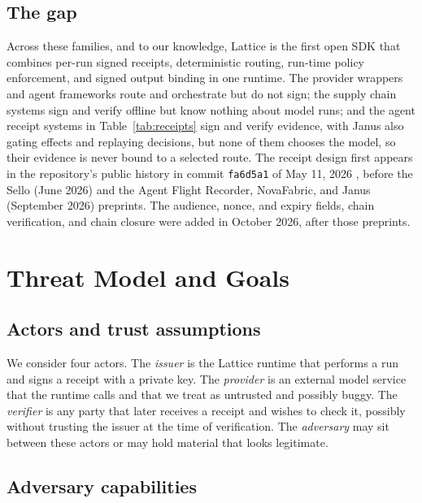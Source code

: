 \documentclass[conference]{IEEEtran}
\newcommand{\code}[1]{\texttt{\small #1}}
\begin{document}
\subsection{The gap}

Across these families, and to our knowledge, Lattice is the first open SDK that
combines per-run signed receipts, deterministic routing, run-time policy enforcement,
and signed output binding in one runtime. The provider wrappers and agent frameworks
route and orchestrate but do not sign; the supply chain systems sign and verify offline
but know nothing about model runs; and the agent receipt systems in
Table~\ref{tab:receipts} sign and verify evidence, with Janus also gating effects
and replaying decisions, but none of them chooses the model, so their evidence is never
bound to a selected route. The receipt design first appears in the repository's
public history in commit \code{fa6d5a1} of May 11, 2026 \cite{lattice}, before the Sello (June 2026)
and the Agent Flight Recorder, NovaFabric, and Janus (September 2026) preprints. The
audience, nonce, and expiry fields, chain verification, and chain closure were added in
October 2026, after those preprints.

\section{Threat Model and Goals}

\subsection{Actors and trust assumptions}

We consider four actors. The \emph{issuer} is the Lattice runtime that performs a
run and signs a receipt with a private key. The \emph{provider} is an external model
service that the runtime calls and that we treat as untrusted and possibly buggy. The
\emph{verifier} is any party that later receives a receipt and wishes to check it,
possibly without trusting the issuer at the time of verification. The
\emph{adversary} may sit between these actors or may hold material that looks
legitimate.

\subsection{Adversary capabilities}
\end{document}
